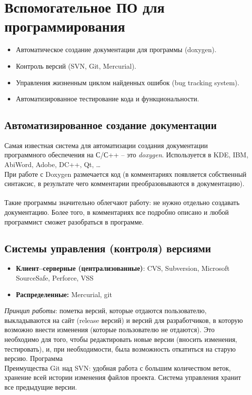 \section{Вспомогательное ПО для программирования}
\begin{itemize}
  \item Автоматическое создание документации для программы (doxygen).
  \item Контроль версий (SVN, Git, Mercurial).
  \item Управления жизненным циклом найденных ошибок (bug tracking system).
  \item Автоматизированное тестирование кода и функциональности.
\end{itemize}
\subsection{Автоматизированное создание документации}
Самая известная система для автоматизации создания документации программного обеспечения на С/С++ -- это \emph{doxygen}. Используется в KDE, IBM, AbiWord, Adobe, DC++, Qt, \dots
\\При работе с Doxygen размечается код (в комментариях появляется собственный синтаксис, в результате чего комментарии преобразовываются в документацию).
\\
\\Такие программы значительно облегчают работу: не нужно отдельно создавать документацию. Более того, в комментариях все подробно описано и любой программист сможет разобраться в программе.
\subsection{Системы управления (контроля) версиями}
\begin{itemize}
  \item \textbf{Клиент--серверные (централизованные)}: CVS, Subversion, Microsoft SourceSafe, Perforce, VSS
  \item \textbf{Распределенные:} Mercurial, git
  \end{itemize}
\emph{Принцип работы}: пометка версий, которые отдаются пользователю, выкладываются на сайт (release версий) и версий для разработчиков, в которую возможно внести изменения (которые пользователю не отдаются). Это необходимо для того, чтобы редактировать новые версии (вносить изменения, тестировать), и, при необходимости, была возможность откатиться на старую версию. Программа
\\Преимущества Git над SVN: удобная работа с большим количеством веток, хранение всей истории изменения файлов проекта. Система управления хранит все предыдущие версии.
